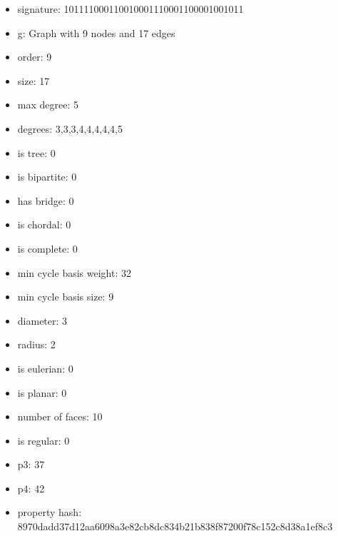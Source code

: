 \newpage
\begin{figure}
\end{figure}
\begin{itemize}
\item signature: 101111000110010001110001100001001011
\item g: Graph with 9 nodes and 17 edges
\item order: 9
\item size: 17
\item max degree: 5
\item degrees: 3,3,3,4,4,4,4,4,5
\item is tree: 0
\item is bipartite: 0
\item has bridge: 0
\item is chordal: 0
\item is complete: 0
\item min cycle basis weight: 32
\item min cycle basis size: 9
\item diameter: 3
\item radius: 2
\item is eulerian: 0
\item is planar: 0
\item number of faces: 10
\item is regular: 0
\item p3: 37
\item p4: 42
\item property hash: 8970dadd37d12aa6098a3e82cb8dc834b21b838f87200f78c152c8d38a1ef8c3
\end{itemize}
